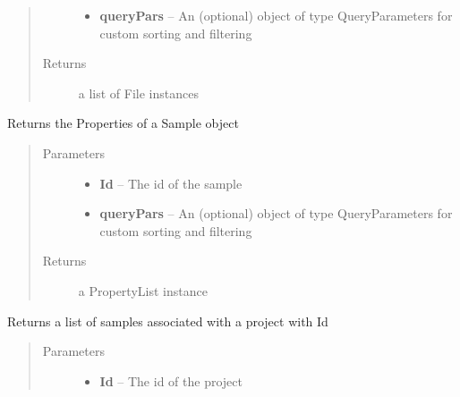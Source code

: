 \documentclass[letterpaper,10pt,english]{sphinxmanual}
\begin{document}
\begin{fulllineitems}
\begin{fulllineitems}
\begin{quote}
\begin{description}
\begin{itemize}
\item {} 
\textbf{queryPars} -- An (optional) object of type QueryParameters for custom sorting and filtering

\end{itemize}

\item[{Returns}] \leavevmode
a list of File instances

\end{description}\end{quote}

\end{fulllineitems}


\begin{fulllineitems}
\label{Available modules:BaseSpacePy.api.BaseSpaceAPI.BaseSpaceAPI.getSamplePropertiesById}
Returns the Properties of a Sample object
\begin{quote}\begin{description}
\item[{Parameters}] \leavevmode\begin{itemize}
\item {} 
\textbf{Id} -- The id of the sample

\item {} 
\textbf{queryPars} -- An (optional) object of type QueryParameters for custom sorting and filtering

\end{itemize}

\item[{Returns}] \leavevmode
a PropertyList instance

\end{description}\end{quote}

\end{fulllineitems}


\begin{fulllineitems}
\label{Available modules:BaseSpacePy.api.BaseSpaceAPI.BaseSpaceAPI.getSamplesByProject}
Returns a list of samples associated with a project with Id
\begin{quote}\begin{description}
\item[{Parameters}] \leavevmode\begin{itemize}
\item {} 
\textbf{Id} -- The id of the project


\end{itemize}
\end{description}
\end{quote}
\end{fulllineitems}
\end{fulllineitems}
\end{document}

